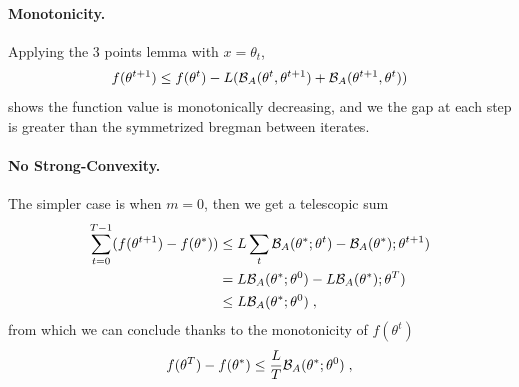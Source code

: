 \documentclass{article}
\newcommand{\logpart}{A}
\newcommand{\bregman}{\cB_\logpart}
\newcommand{\natp}{\theta}
\begin{document}
\paragraph{Monotonicity.}
Applying the 3 points lemma with $x=\natp_t$, 
\begin{align}
	f(\natp^{t+1}) \leq  f(\natp^t) -L (\bregman(\natp^{t}, \natp^{t+1}) + \bregman(\natp^{t+1} , \natp^{t} ))
\end{align}
shows the function value is monotonically decreasing, and we the gap at each step is greater than the symmetrized bregman between iterates. 

\paragraph{No Strong-Convexity.}
The simpler case is when $m=0$, then we get a telescopic sum
\begin{align}
	\sum_{t=0}^{T-1} (f(\natp^{t+1}) - f(\natp^*)) 
	&\leq L \sum_t \bregman(\natp^{*}; \natp^{t}) - \bregman(\natp^{*}); \natp^{t+1}) \\
	&= L \bregman(\natp^{*}; \natp^{0}) - L\bregman(\natp^{*}); \natp^{T})\\
	&\leq L \bregman(\natp^{*}; \natp^{0}) \; ,
\end{align}
from which we can conclude thanks to the monotonicity of $f(\natp^t)$
\begin{align}
	f(\natp^{T}) - f(\natp^*)
	\leq  \frac{L}{T} \bregman(\natp^{*}; \natp^{0}) \; ,
\end{align}
\end{document}
